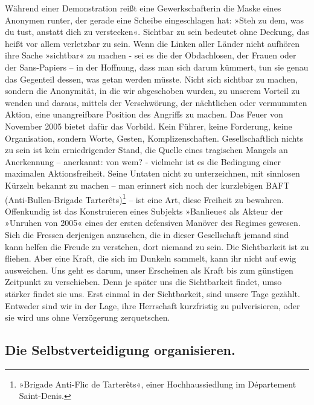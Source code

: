 Während einer Demonstration reißt eine Gewerkschafterin die Maske
eines Anonymen runter, der gerade eine Scheibe eingeschlagen hat:
»Steh zu dem, was du tust, anstatt dich zu verstecken«. Sichtbar zu
sein bedeutet ohne Deckung, das heißt vor allem verletzbar zu sein.
Wenn die Linken aller Länder nicht aufhören ihre Sache »sichtbar«
zu machen - sei es die der Obdachlosen, der Frauen oder der
Sans-Papiers – in der Hoffnung, dass man sich darum kümmert, tun
sie genau das Gegenteil dessen, was getan werden müsste. Nicht sich
sichtbar zu machen, sondern die Anonymität, in die wir abgeschoben
wurden, zu unserem Vorteil zu wenden und daraus, mittels der
Verschwörung, der nächtlichen oder vermummten Aktion, eine
unangreifbare Position des Angriffs zu machen. Das Feuer von
November 2005 bietet dafür das Vorbild. Kein Führer, keine
Forderung, keine Organisation, sondern Worte, Gesten,
Komplizenschaften. Gesellschaftlich nichts zu sein ist kein
erniedrigender Stand, die Quelle eines tragischen Mangels an
Anerkennung – anerkannt: von wem? - vielmehr ist es die Bedingung
einer maximalen Aktionsfreiheit. Seine Untaten nicht zu
unterzeichnen, mit sinnlosen Kürzeln bekannt zu machen – man
erinnert sich noch der kurzlebigen BAFT (Anti-Bullen-Brigade
Tarterêts)\footnote{
»Brigade Anti-Flic de Tarterêts«, einer Hochhaussiedlung im
Département Saint-Denis.
}%
 – ist eine Art, diese Freiheit zu bewahren.
Offenkundig ist das Konstruieren eines Subjekts »Banlieue« als
Akteur der »Unruhen von 2005« eines der ersten defensiven Manöver
des Regimes gewesen. Sich die Fressen derjenigen anzusehen, die in
dieser Gesellschaft jemand sind kann helfen die Freude zu
verstehen, dort niemand zu sein.
Die Sichtbarkeit ist zu fliehen. Aber eine Kraft, die sich im
Dunkeln sammelt, kann ihr nicht auf ewig ausweichen. Uns geht es
darum, unser Erscheinen als Kraft bis zum günstigen Zeitpunkt zu
verschieben. Denn je später uns die Sichtbarkeit findet, umso
stärker findet sie uns. Erst einmal in der Sichtbarkeit, sind
unsere Tage gezählt. Entweder sind wir in der Lage, ihre Herrschaft
kurzfristig zu pulverisieren, oder sie wird uns ohne Verzögerung
zerquetschen.

\subsection{Die Selbstverteidigung organisieren.}

